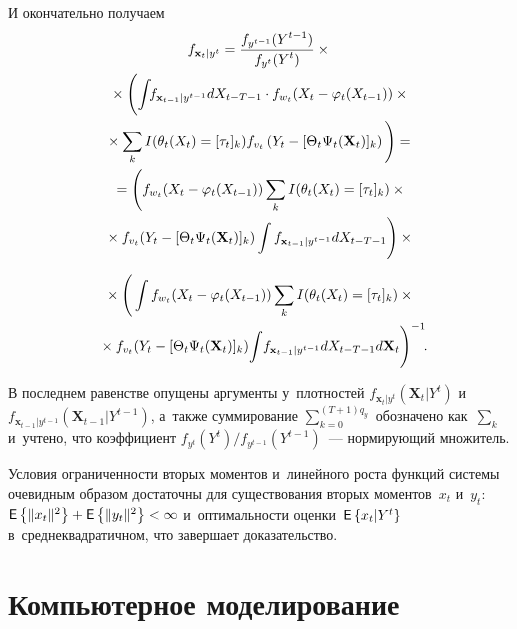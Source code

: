 \begin{multicols}{2}
 \noindent
     И окончательно получаем
     \begin{multline*}
     f_{\mathbf{x}_t\vert y^t} = \displaystyle\frac{\displaystyle f_{y^{t-1}}(Y^{t-1})\mathstrut}{\displaystyle f_{y^t}(Y^t)\mathstrut} \times{}\\
     {}\times
    \Bigg( \!\int\!\! f_{\mathbf{x}_{t-1}\vert y^{t-1}} 
dX_{t-T-1}\cdot f_{w_t} (X_t -\varphi_t(X_{t-1})) \times{}\\
{}\times \sum\limits_k 
I(\theta_t(X_t)=[\tau_t]_k) f_{v_t} \left(Y_t -[\Theta_t \Psi_t 
(\mathbf{X}_t)]_k\right)\Bigg) ={} \\
     {}=
     \Bigg(f_{w_t}(X_t-\varphi_t(X_{t-1}))\sum\limits_k 
I(\theta_t(X_t)=[\tau_t]_k)\times{}\\
{}\times
 f_{v_t}(Y_t-[\Theta_t\Psi_t(\mathbf{X}_t)]_k) \int 
f_{\mathbf{x}_{t-1}\vert y^{t-1}} dX_{t-T-1}\Bigg)\times{}
\end{multline*}

\noindent
\begin{multline*}
{}\times 
\Bigg(\int f_{w_t} (X_t -
\varphi_t(X_{t-1}))\sum\limits_k I(\theta_t(X_t) =[\tau_t]_k) \times{}\\
{}\times 
f_{v_t} (Y_t -
[\Theta_t\Psi_t(\mathbf{X}_t)]_k) \!\int\! f_{\mathbf{x}_{t-1}\vert y^{t-1}} dX_{t-T-1} d\mathbf{X}_t\Bigg)^{-1}\!.\hspace*{-4.87433pt}
     \end{multline*}
     
   \noindent
     В последнем равенстве опущены аргументы у~плотностей 
$f_{\mathbf{x}_t\vert y^t} (\mathbf{X}_t\vert Y^t)$  
и~$f_{\mathbf{x}_{t-1}\vert y^{t-1}} (\mathbf{X}_{t-1}\vert Y^{t-1})$, 
а~так\-же суммирование $\sum\nolimits_{k=0}^{(T+1)q_y}$ обозначено 
как~$\sum\nolimits_k$ и~учтено, что коэффициент $f_{y^t} (Y^t)/f_{y^{t-1}} 
(Y^{t-1})$~--- нор\-ми\-ру\-ющий множитель.
     
     Условия ограниченности вторых моментов и~линейного рос\-та функций 
сис\-те\-мы очевидным образом достаточны для существования вторых 
моментов~$x_t$ и~$y_t$: ${\sf E} \left\{ \| x_t\|^2\right\} \hm+ {\sf E} \left\{ \| y_t\|^2\right\} \hm<\infty$ 
и~\mbox{оп\-ти\-маль\-ности} оценки~${\sf E} \left\{ x_t\vert Y^t\right\}$ в~сред\-не\-квад\-ра\-тич\-ном, что завершает доказательство.


     
\section{Компьютерное моделирование}


\end{multicols}
